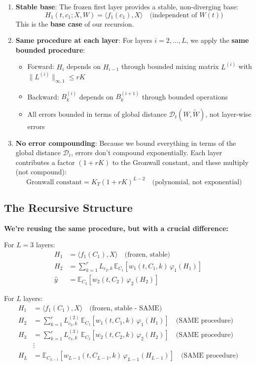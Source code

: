 \begin{enumerate}
\item \textbf{Stable base}: The frozen first layer provides a stable, non-diverging base:
   \[
   H_1(t, c_1; X, W) = \langle f_1(c_1), X\rangle \quad \text{(independent of $W(t)$)}
   \]
   This is the \textbf{base case} of our recursion.

\item \textbf{Same procedure at each layer}: For layers $i = 2, \ldots, L$, we apply the \textbf{same bounded procedure}:
   \begin{itemize}
   \item Forward: $H_i$ depends on $H_{i-1}$ through bounded mixing matrix $L^{(i)}$ with $\|L^{(i)}\|_{\infty,1} \le rK$
   \item Backward: $B_k^{(i)}$ depends on $B_k^{(i+1)}$ through bounded operations
   \item All errors bounded in terms of global distance $\mathscr{D}_t(W, \tilde{W})$, not layer-wise errors
   \end{itemize}

\item \textbf{No error compounding}: Because we bound everything in terms of the global distance $\mathscr{D}_t$, errors don't compound exponentially. Each layer contributes a factor $(1+rK)$ to the Gronwall constant, and these multiply (not compound):
   \[
   \text{Gronwall constant} = K_T(1+rK)^{L-2} \quad \text{(polynomial, not exponential)}
   \]
\end{enumerate}

\subsection{The Recursive Structure}

\textbf{We're reusing the same procedure, but with a crucial difference:}

For $L=3$ layers:
\begin{align*}
H_1 &= \langle f_1(C_1), X\rangle \quad \text{(frozen, stable)}\\
H_2 &= \sum_{k=1}^r L_{c_2,k}\,\mathbb{E}_{C_1}[w_1(t, C_1, k)\,\varphi_1(H_1)]\\
\hat{y} &= \mathbb{E}_{C_2}[w_2(t, C_2)\,\varphi_2(H_2)]
\end{align*}

For $L$ layers:
\begin{align*}
H_1 &= \langle f_1(C_1), X\rangle \quad \text{(frozen, stable - SAME)}\\
H_2 &= \sum_{k=1}^r L^{(2)}_{c_2,k}\,\mathbb{E}_{C_1}[w_1(t, C_1, k)\,\varphi_1(H_1)] \quad \text{(SAME procedure)}\\
H_3 &= \sum_{k=1}^r L^{(3)}_{c_3,k}\,\mathbb{E}_{C_2}[w_2(t, C_2, k)\,\varphi_2(H_2)] \quad \text{(SAME procedure)}\\
&\vdots\\
H_L &= \mathbb{E}_{C_{L-1}}[w_{L-1}(t, C_{L-1}, k)\,\varphi_{L-1}(H_{L-1})] \quad \text{(SAME procedure)}
\end{align*}

